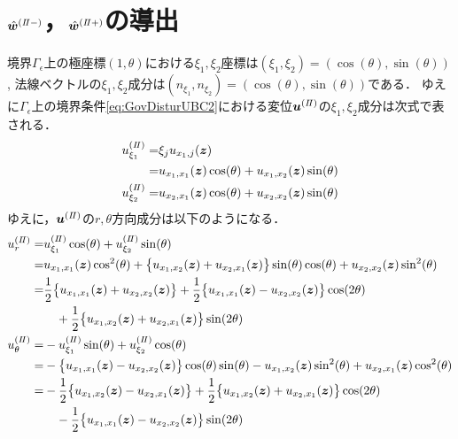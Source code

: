 \newpage


\section{$\hat{\bm{w}}^{(I\hspace{-.15em}I-)}$，$\hat{\bm{w}}^{(I\hspace{-.15em}I+)}$の導出}
境界$\Gamma_{\epsilon}$上の極座標$(1,\theta)$における$\xi_1,\xi_2$座標は$(\xi_1,\xi_2)=(\cos(\theta),\sin(\theta))$,
法線ベクトルの$\xi_1,\xi_2$成分は$(n_{\xi_1},n_{\xi_2})=(\cos(\theta),\sin(\theta))$である．
ゆえに$\Gamma_\epsilon$上の境界条件\eqref{eq:GovDisturUBC2}における変位$\bm{u}^{(I\hspace{-.15em}I)}$の$\xi_1,\xi_2$成分は次式で表される．
\begin{align}
	u_{\xi_1}^{(I\hspace{-.15em}I)}=&\xi_{j} u_{x_{1},j}(\bm{z})
	\nonumber
	\\
	=&u_{x_{1},x_{1}}(\bm{z})\cos(\theta)+u_{x_{1},x_{2}}(\bm{z})\sin(\theta)
	\\
	u_{\xi_2}^{(I\hspace{-.15em}I)}=
	&u_{x_{2},x_{1}}(\bm{z})\cos(\theta)+u_{x_{2},x_{2}}(\bm{z})\sin(\theta)
\end{align}
ゆえに，$\bm{u}^{(I\hspace{-.15em}I)}$の$r,\theta$方向成分は以下のようになる．
\begin{align}
	u_{r}^{(I\hspace{-.15em}I)}=
		&u_{\xi_1}^{(I\hspace{-.15em}I)}\cos(\theta)+u_{\xi_2}^{(I\hspace{-.15em}I)}\sin(\theta)
		\nonumber
		\\
		=&u_{x_{1},x_{1}}(\bm{z})\cos^2(\theta)+\bigl\{u_{x_{1},x_{2}}(\bm{z})
		+u_{x_{2},x_{1}}(\bm{z})\bigr\}\sin(\theta)\cos(\theta)
		+u_{x_{2},x_{2}}(\bm{z})\sin^2(\theta)
		\nonumber
		\\
		=&\frac{1}{2}\bigl\{u_{x_{1},x_{1}}(\bm{z})+u_{x_{2},x_{2}}(\bm{z})\bigr\}
		+\frac{1}{2}\bigl\{u_{x_{1},x_{1}}(\bm{z})-u_{x_{2},x_{2}}(\bm{z})\bigr\}\cos(2\theta)
		\nonumber
		\\
		&\quad+\frac{1}{2}\bigl\{u_{x_{1},x_{2}}(\bm{z})+u_{x_{2},x_{1}}(\bm{z})\bigr\}\sin(2\theta)
		\\
	u_{\theta}^{(I\hspace{-.15em}I)}=
		&-u_{\xi_1}^{(I\hspace{-.15em}I)}\sin(\theta)+u_{\xi_2}^{(I\hspace{-.15em}I)}\cos(\theta)
		\nonumber
		\\
		=&-\bigl\{u_{x_{1},x_{1}}(\bm{z})-u_{x_{2},x_{2}}(\bm{z})\bigr\}\cos(\theta)\sin(\theta)
		-u_{x_{1},x_{2}}(\bm{z})\sin^2(\theta)+u_{x_{2},x_{1}}(\bm{z})\cos^2(\theta)
		\nonumber
		\\
		=&-\frac{1}{2}\bigl\{u_{x_{1},x_{2}}(\bm{z})-u_{x_{2},x_{1}}(\bm{z})\bigr\}
		+\frac{1}{2}\bigl\{u_{x_{1},x_{2}}(\bm{z})+u_{x_{2},x_{1}}(\bm{z})\bigr\}\cos(2\theta)
		\nonumber
		\\
		&\quad-\frac{1}{2}\bigl\{u_{x_{1},x_{1}}(\bm{z})-u_{x_{2},x_{2}}(\bm{z})\bigr\}\sin(2\theta)
\end{align}

